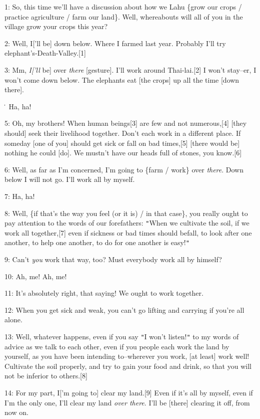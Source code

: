 
1: So, this time we'll have a discussion about how we Lahu \{grow our crops / practice
agriculture / farm our land\}. Well, whereabouts will all of you in the village
grow your crops this year?

2: Well, I['ll be] down below. Where I farmed last year. Probably I'll try elephant's-Death-Valley.[1]

3: Mm, \textit{I['ll} be] over \textit{there} [gesture]. I'll work around Thai-lai.[2]
I won't stay--er, I won't come down below. The elephants eat [the crops] up all
the time [down there].

\. Ha, ha!

5: Oh, my brothers! When human beings[3] are few and not numerous,[4] [they should]
seek their livelihood together. Don't each work in a different place. If someday
[one of you] should get sick or fall on bad times,[5] [there would be] nothing
he could [do]. We mustn't have our heads full of stones, you know.[6]

6: Well, as far as I'm concerned, I'm going to \{farm / work\} over \textit{there}.
Down below I will not go. I'll work all by myself.

7: Ha, ha!

8: Well, \{if that's the way you feel (or it is) / in that case\}, you really ought
to pay attention to the words of our forefathers: \texttt{"}When we cultivate the
soil, if we work all together,[7] even if sickness or bad times should befall,
to look after one another, to help one another, to do for one another is easy!\texttt{"}


9: Can't \textit{you} work that way, too? Must everybody work all by himself?

10: Ah, me! Ah, me!

11: It's absolutely right, that saying! We ought to work together.

12: When you get sick and weak, you can't go lifting and carrying if you're all
alone.

13: Well, whatever happens, even if you say \texttt{"}I won't listen!\texttt{"}
to my words of advice as we talk to each other, even if you people each work the
land by yourself, as you have been intending to--wherever you work, [at least]
work well! Cultivate the soil properly, and try to gain your food and drink, so
that you will not be inferior to others.[8]

14: For my part, I['m going to] clear my land.[9] Even if it's all by myself, even
if I'm the only one, I'll clear my land \textit{over there}. I'll be [there] clearing
it off, from now on.

